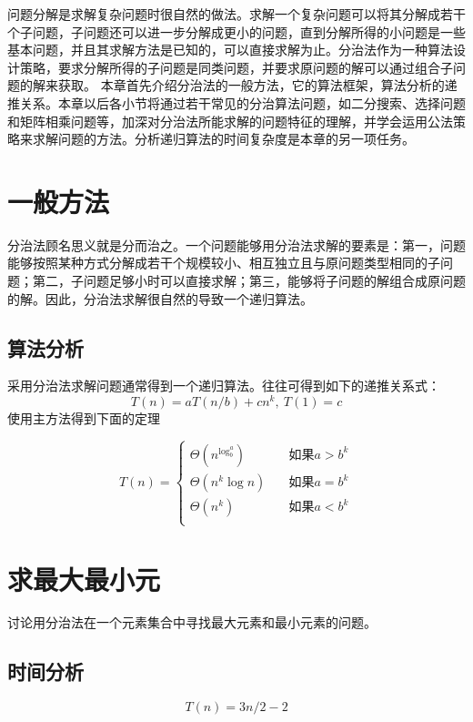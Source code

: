 问题分解是求解复杂问题时很自然的做法。求解一个复杂问题可以将其分解成若干个子问题，子问题还可以进一步分解成更小的问题，直到分解所得的小问题是一些基本问题，并且其求解方法是已知的，可以直接求解为止。分治法作为一种算法设计策略，要求分解所得的子问题是同类问题，并要求原问题的解可以通过组合子问题的解来获取。
本章首先介绍分治法的一般方法，它的算法框架，算法分析的递推关系。本章以后各小节将通过若干常见的分治算法问题，如二分搜索、选择问题和矩阵相乘问题等，加深对分治法所能求解的问题特征的理解，并学会运用公法策略来求解问题的方法。分析递归算法的时间复杂度是本章的另一项任务。
\section{一般方法}
分治法顾名思义就是分而治之。一个问题能够用分治法求解的要素是：第一，问题能够按照某种方式分解成若干个规模较小、相互独立且与原问题类型相同的子问题；第二，子问题足够小时可以直接求解；第三，能够将子问题的解组合成原问题的解。因此，分治法求解很自然的导致一个递归算法。

\subsection*{算法分析}
采用分治法求解问题通常得到一个递归算法。往往可得到如下的递推关系式：
\begin{equation}
	T(n)=aT(n/b)+cn^k,\ T(1)=c
\end{equation}
使用主方法得到下面的定理
\begin{theorem}{}{}
	\begin{equation}
		T(n)=\begin{cases}
			\Theta(n^{\log_b^a})\quad &\text{如果}a>b^k\\
			\Theta(n^k\log n)\quad &\text{如果}a=b^k\\
			\Theta(n^k)\quad &\text{如果}a<b^k\\
		\end{cases}
	\end{equation}
\end{theorem}
\section{求最大最小元}
讨论用分治法在一个元素集合中寻找最大元素和最小元素的问题。

\subsection*{时间分析}
\begin{equation}
	T(n)=3n/2-2
\end{equation}
